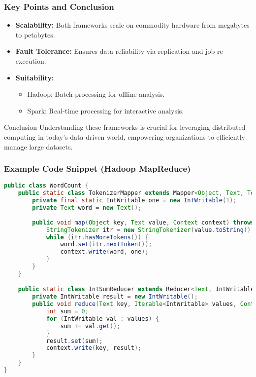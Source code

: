 \documentclass[aspectratio=169]{beamer}
\begin{document}
\begin{frame}
    \frametitle{Key Points and Conclusion}
    \begin{itemize}
        \item \textbf{Scalability:} Both frameworks scale on commodity hardware from megabytes to petabytes.
        \item \textbf{Fault Tolerance:} Ensures data reliability via replication and job re-execution.
        \item \textbf{Suitability:}
        \begin{itemize}
            \item Hadoop: Batch processing for offline analysis.
            \item Spark: Real-time processing for interactive analysis.
        \end{itemize}
    \end{itemize}
    \begin{block}{Conclusion}
        Understanding these frameworks is crucial for leveraging distributed computing in today’s data-driven world, empowering organizations to efficiently manage large datasets.
    \end{block}
\end{frame}

\begin{frame}[fragile]
    \frametitle{Example Code Snippet (Hadoop MapReduce)}
    \begin{lstlisting}[language=Java]
public class WordCount {
    public static class TokenizerMapper extends Mapper<Object, Text, Text, IntWritable> {
        private final static IntWritable one = new IntWritable(1);
        private Text word = new Text();
        
        public void map(Object key, Text value, Context context) throws IOException, InterruptedException {
            StringTokenizer itr = new StringTokenizer(value.toString());
            while (itr.hasMoreTokens()) {
                word.set(itr.nextToken());
                context.write(word, one);
            }
        }
    }

    public static class IntSumReducer extends Reducer<Text, IntWritable, Text, IntWritable> {
        private IntWritable result = new IntWritable();
        public void reduce(Text key, Iterable<IntWritable> values, Context context) throws IOException, InterruptedException {
            int sum = 0;
            for (IntWritable val : values) {
                sum += val.get();
            }
            result.set(sum);
            context.write(key, result);
        }
    }
}
    \end{lstlisting}
\end{frame}
\end{document}
